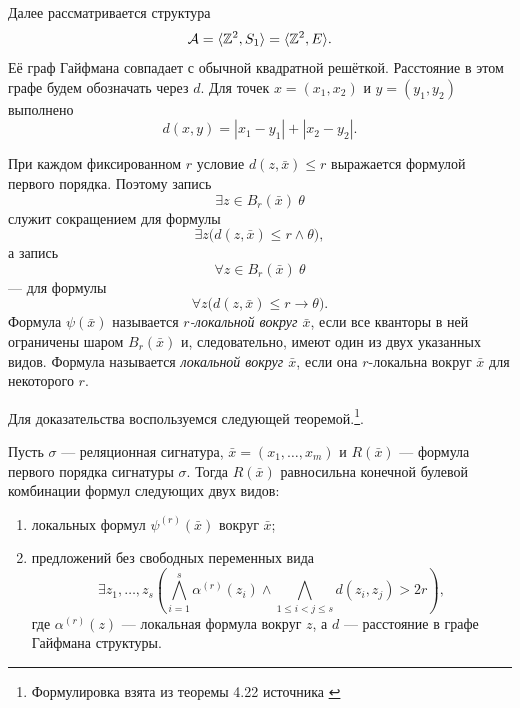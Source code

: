 \begin{definition}
    Далее рассматривается структура
    $$
        \mathcal A=\langle\mathbb{Z}^2,S_1\rangle
        =\langle\mathbb{Z}^2,E\rangle.
    $$
    Её граф Гайфмана совпадает с обычной квадратной решёткой. Расстояние в
    этом графе будем обозначать через $d$. Для точек
    $x=(x_1,x_2)$ и $y=(y_1,y_2)$ выполнено
    $$
        d(x,y)=|x_1-y_1|+|x_2-y_2|.
    $$
\end{definition}

\begin{definition}
    При каждом фиксированном $r$ условие $d(z,\bar x)\le r$ выражается
    формулой первого порядка. Поэтому запись
    $$
        \exists z\in B_r(\bar x)\ \theta
    $$
    служит сокращением для формулы
    $$
        \exists z\bigl(d(z,\bar x)\le r\land\theta\bigr),
    $$
    а запись
    $$
        \forall z\in B_r(\bar x)\ \theta
    $$
    --- для формулы
    $$
        \forall z\bigl(d(z,\bar x)\le r\longrightarrow\theta\bigr).
    $$
    Формула $\psi(\bar x)$ называется \textit{$r$-локальной вокруг $\bar x$},
    если все кванторы в ней ограничены шаром $B_r(\bar x)$ и, следовательно,
    имеют один из двух указанных видов. Формула называется
    \textit{локальной вокруг $\bar x$}, если она $r$-локальна вокруг $\bar x$
    для некоторого $r$.
\end{definition}

Для доказательства воспользуемся следующей теоремой.\footnote{Формулировка взята из теоремы 4.22 источника \cite{Finite_Model_Theory_Libkin}}.

\begin{namedTheorem} \label{theorem:Geifman}
    Пусть $\sigma$ --- реляционная сигнатура,
    $\bar x=(x_1,\ldots,x_m)$ и $R(\bar x)$ --- формула первого порядка
    сигнатуры $\sigma$. Тогда $R(\bar x)$ равносильна
    конечной булевой комбинации формул следующих двух видов:
    \begin{enumerate}
        \item локальных формул $\psi^{(r)}(\bar x)$ вокруг $\bar x$;
        \item предложений без свободных переменных вида
        $$
        \exists z_1,\ldots,z_s
        \left(
            \bigwedge_{i=1}^{s}\alpha^{(r)}(z_i)
            \land
            \bigwedge_{1\le i<j\le s} d(z_i,z_j)>2r
        \right),
        $$
        где $\alpha^{(r)}(z)$ --- локальная формула вокруг $z$, а $d$ ---
        расстояние в графе Гайфмана структуры.
    \end{enumerate}
\end{namedTheorem}

